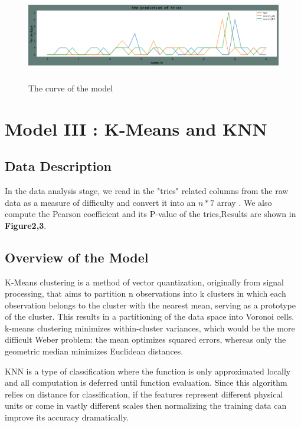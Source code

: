 \documentclass[12pt]{article}
\begin{document}
\begin{figure}[htbp]
	
	\centering
	\includegraphics[height=4cm, width=16cm]{T1.png}
	\caption{The curve of the model}
	
\end{figure}

\newpage{}

\section{Model III : K-Means and KNN}
\subsection{Data Description}
In the data analysis stage, we read in the "tries" related columns from the raw data as a measure of difficulty and convert it into an $n * 7$ array .
We also compute the Pearson coefficient and its P-value of the tries,Results are shown in \textbf{Figure2,3}.

\subsection{Overview of the Model}
K-Means clustering is a method of vector quantization, originally from signal processing, that aims to partition n observations into k clusters in which each observation belongs to the cluster with the nearest mean, serving as a prototype of the cluster. This results in a partitioning of the data space into Voronoi cells. k-means clustering minimizes within-cluster variances, which would be the more difficult Weber problem: the mean optimizes squared errors, whereas only the geometric median minimizes Euclidean distances.

KNN is a type of classification where the function is only approximated locally and all computation is deferred until function evaluation. Since this algorithm relies on distance for classification, if the features represent different physical units or come in vastly different scales then normalizing the training data can improve its accuracy dramatically.
\end{document}

